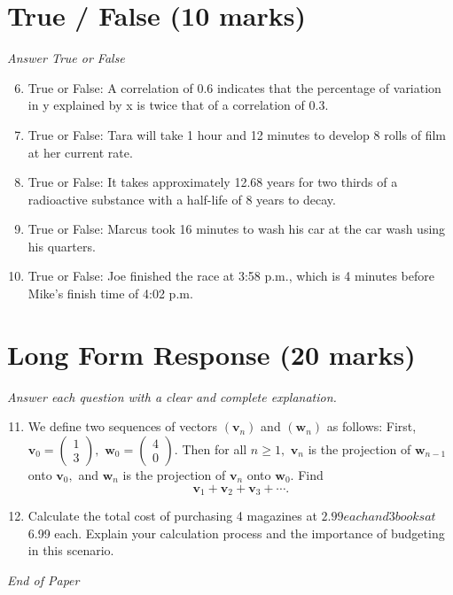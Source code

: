 \documentclass[12pt]{article}
\begin{document}
\section*{True / False (10 marks)}
\textit{Answer True or False}
\begin{enumerate}[label=\arabic*.]
\setcounter{enumi}{5}
\item True or False: A correlation of 0.6 indicates that the percentage of variation in y explained by x is twice that of a correlation of 0.3.
\item True or False: Tara will take 1 hour and 12 minutes to develop 8 rolls of film at her current rate.
\item True or False: It takes approximately 12.68 years for two thirds of a radioactive substance with a half-life of 8 years to decay.
\item True or False: Marcus took 16 minutes to wash his car at the car wash using his quarters.
\item True or False: Joe finished the race at 3:58 p.m., which is 4 minutes before Mike's finish time of 4:02 p.m.
\end{enumerate}

\section*{Long Form Response (20 marks)}
\textit{Answer each question with a clear and complete explanation.}
\begin{enumerate}[label=\arabic*.]
\setcounter{enumi}{10}
\item We define two sequences of vectors $(\mathbf{v}_n)$ and $(\mathbf{w}_n)$ as follows: First, $\mathbf{v}_0 = \begin{pmatrix} 1 \\ 3 \end{pmatrix},$ $\mathbf{w}_0 = \begin{pmatrix} 4 \\ 0 \end{pmatrix}.$ Then for all $n \ge 1,$ $\mathbf{v}_n$ is the projection of $\mathbf{w}_{n - 1}$ onto $\mathbf{v}_0,$ and $\mathbf{w}_n$ is the projection of $\mathbf{v}_n$ onto $\mathbf{w}_0.$ Find \[\mathbf{v}_1 + \mathbf{v}_2 + \mathbf{v}_3 + \dotsb.\]
\item Calculate the total cost of purchasing 4 magazines at $2.99 each and 3 books at $6.99 each. Explain your calculation process and the importance of budgeting in this scenario.
\end{enumerate}

\vfill
\noindent\textit{End of Paper}
\end{document}
